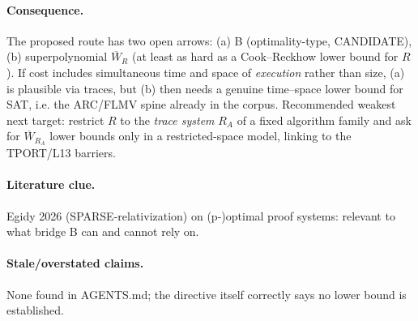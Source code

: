 \documentclass{article}
\begin{document}
\paragraph{Consequence.} The proposed route has two open arrows: (a) B (optimality-type, CANDIDATE), (b) superpolynomial $\overline W_R$ (at least as hard as a Cook--Reckhow lower bound for $R$). If cost includes simultaneous time and space of \emph{execution} rather than size, (a) is plausible via traces, but (b) then needs a genuine time--space lower bound for SAT, i.e. the ARC/FLMV spine already in the corpus. Recommended weakest next target: restrict $R$ to the \emph{trace system} $R_A$ of a fixed algorithm family and ask for $\overline W_{R_A}$ lower bounds only in a restricted-space model, linking to the TPORT/L13 barriers.

\paragraph{Literature clue.} Egidy 2026 (SPARSE-relativization) on (p-)optimal proof systems: relevant to what bridge B can and cannot rely on.

\paragraph{Stale/overstated claims.} None found in AGENTS.md; the directive itself correctly says no lower bound is established.
\end{document}
